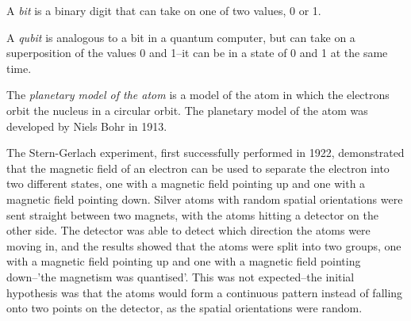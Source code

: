 
\begin{definition}
    A \emph{bit} is a binary digit that can take on one of two values, 0 or 1.
\end{definition}
\begin{definition}
    A \emph{qubit} is analogous to a bit in a quantum computer, but can take on a superposition of the values 0 and 1–it can be in a state of 0 and 1 at the same time.
\end{definition}
\begin{definition}
    The \emph{planetary model of the atom} is a model of the atom in which the electrons orbit the nucleus in a circular orbit. The planetary model of the atom was developed by Niels Bohr in 1913.
\end{definition}
The Stern-Gerlach experiment, first successfully performed in 1922, demonstrated that the magnetic field of an electron can be used to separate the electron into two different states, one with a magnetic field pointing up and one with a magnetic field pointing down. Silver atoms with random spatial orientations were sent straight between two magnets, with the atoms hitting a detector on the other side. The detector was able to detect which direction the atoms were moving in, and the results showed that the atoms were split into two groups, one with a magnetic field pointing up and one with a magnetic field pointing down–'the magnetism was quantised'. This was not expected–the initial hypothesis was that the atoms would form a continuous pattern instead of falling onto two points on the detector, as the spatial orientations were random.
